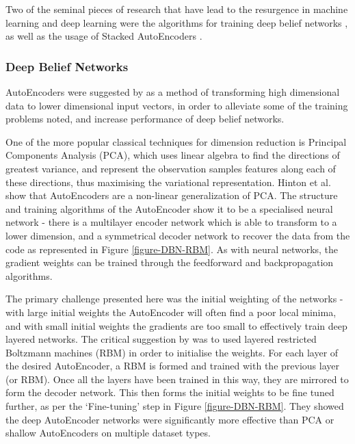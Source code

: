 \documentclass[a4paper,11pt,oneside]{article}
\theoremstyle{plain}
\theoremstyle{definition}
\begin{document}
	
	Two of the seminal pieces of research that have lead to the resurgence in machine learning and deep learning 
	were the algorithms for training deep belief networks \citep{Hinton1}, as well as the usage of Stacked AutoEncoders \citep{Ranzato1, Bengio1}. 
	
	
	\subsubsection{Deep Belief Networks}\label{DBN}
	
	AutoEncoders were suggested by \citet{Hinton2} as a method of transforming high dimensional 
	data to lower dimensional input vectors, in order to alleviate some of the training problems noted, and increase 
	performance of deep belief networks.
	\hfill \break 
	
	One of the more popular classical techniques for dimension reduction is Principal Components Analysis (PCA), 
	which uses linear algebra to find the directions of greatest variance, and represent the observation samples 
	features along each of these directions, thus maximising the variational representation. Hinton et al. show that 
	AutoEncoders are a non-linear generalization of PCA. The structure and training algorithms of the AutoEncoder 
	show it to be a specialised neural network - there is a multilayer encoder network which is able to transform to a 
	lower dimension, and a symmetrical decoder network to recover the data from the code as represented in Figure \ref{figure-DBN-RBM}. As with 
	neural networks, the gradient weights can be trained through the feedforward and backpropagation algorithms.  
	\hfill \break 
	
	The primary challenge presented here was the initial weighting of the networks - with large initial weights the 
	AutoEncoder will often find a poor local minima, and with small initial weights the gradients are too small to 
	effectively train deep layered networks. The critical suggestion by \citet{Hinton3} was to used layered restricted 
	Boltzmann machines (RBM) in order to initialise the weights. For each layer of the desired AutoEncoder, a RBM is 
	formed and trained with the previous layer (or RBM). Once all the layers have been 
	trained in this way, they are mirrored to form the decoder network. This then forms the initial weights to be fine 
	tuned further, as per the `Fine-tuning' step in Figure \ref{figure-DBN-RBM}. They showed the deep AutoEncoder networks were significantly more 
	effective than PCA or shallow AutoEncoders on multiple dataset types.
	
\end{document}
